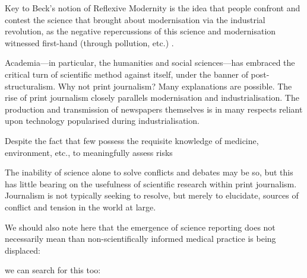 Key to Beck's notion of Reflexive Modernity is the idea that people confront and contest the science that brought about modernisation via the industrial revolution, as the negative repercussions of this science and modernisation witnessed first-hand (through pollution, etc.) \cite{ross_science_1996}.

Academia---in particular, the humanities and social sciences---has embraced the critical turn of scientific method against itself, under the banner of post-structuralism. Why not print journalism? Many explanations are possible. The rise of print journalism closely parallels modernisation and industrialisation. The production and transmission of newspapers themselves is in many respects reliant upon technology popularised during industrialisation. 


Despite the fact that few possess the requisite knowledge of medicine, environment, etc., to meaningfully assess risks

The inability of science alone to solve conflicts and debates may be so, but this has little bearing on the usefulness of scientific research within print journalism. Journalism is not typically seeking to resolve, but merely to elucidate, sources of conflict and tension in the world at large.

We should also note here that the emergence of science reporting does not necessarily mean than non-scientifically informed medical practice is being displaced:

we can search for this too:

